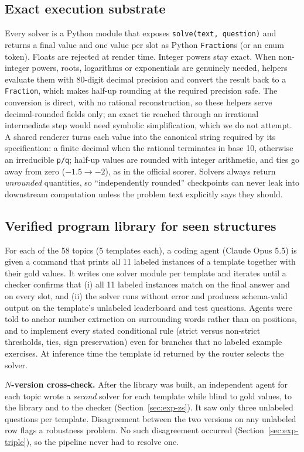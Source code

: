 \documentclass[conference]{IEEEtran}
\begin{document}
\subsection{Exact execution substrate}
Every solver is a Python module that exposes \texttt{solve(text, question)} and returns a final value and one value per
slot as Python \texttt{Fraction}s (or an enum token). Floats are rejected at render time. Integer powers stay exact.
When non-integer powers, roots, logarithms or exponentials are genuinely needed, helpers evaluate them with 80-digit
decimal precision and convert the result back to a \texttt{Fraction}, which makes half-up rounding at the required
precision safe. The conversion is direct, with no rational reconstruction, so these helpers serve decimal-rounded
fields only; an exact tie reached through an irrational intermediate step would need symbolic simplification, which
we do not attempt. A shared renderer turns each value into the canonical string required by its
specification: a finite
decimal when the rational terminates in base 10, otherwise an irreducible \texttt{p/q}; half-up values are rounded
with integer arithmetic, and ties go away from zero ($-1.5 \rightarrow -2$), as in the official scorer. Solvers always
return \emph{unrounded} quantities, so ``independently rounded'' checkpoints can
never leak into downstream computation unless the problem text explicitly says they should.

\subsection{Verified program library for seen structures}\label{sec:library}
For each of the 58 topics (5 templates each), a coding agent (Claude Opus 5.5) is given a command that prints all 11
labeled instances
of a template together with their gold values. It writes one solver module per template and iterates until a checker
confirms that (i) all 11 labeled instances match on the final answer and on every slot, and (ii) the solver runs
without error and produces schema-valid output on the template's unlabeled leaderboard and test questions. Agents were
told to anchor number extraction on surrounding words rather than on positions, and to implement every stated
conditional rule (strict versus non-strict thresholds, ties, sign preservation) even for branches that no labeled
example exercises. At inference time the template id returned by the router selects the solver.

\textbf{$N$-version cross-check.} After the library was built, an independent agent for each topic wrote a
\emph{second} solver for each template while blind to gold values, to the library and to the checker
(Section~\ref{sec:exp-zs}). It saw only three unlabeled questions per template. Disagreement between the two versions
on any unlabeled row flags a robustness problem. No such disagreement occurred (Section~\ref{sec:exp-triple}), so
the pipeline never had to resolve one.
\end{document}
